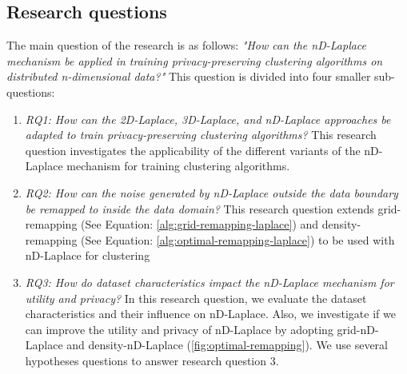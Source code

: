 \subsection{Research questions}
The main question of the research is as follows: \newline \newline
\textit{"How can the nD-Laplace mechanism be applied in training privacy-preserving clustering algorithms on distributed n-dimensional data?"} \newline
This question is divided into four smaller sub-questions:
\begin{enumerate}
  \item \textit{RQ1: How can the 2D-Laplace, 3D-Laplace, and nD-Laplace approaches be adapted to train privacy-preserving clustering algorithms?} \newline
        This research question investigates the applicability of the different variants of the nD-Laplace mechanism for training clustering algorithms.
  \item \textit{RQ2: How can the noise generated by nD-Laplace outside the data boundary be remapped to inside the data domain?} \newline
        This research question extends grid-remapping (See Equation: \ref{alg:grid-remapping-laplace}) and density-remapping (See Equation: \ref{alg:optimal-remapping-laplace}) to be used with nD-Laplace for clustering
  \item \textit{RQ3: How do dataset characteristics impact the nD-Laplace mechanism for utility and privacy?} \newline
        In this research question, we evaluate the dataset characteristics and their influence on nD-Laplace.
        Also, we investigate if we can improve the utility and privacy of nD-Laplace by adopting grid-nD-Laplace and density-nD-Laplace (\ref{fig:optimal-remapping}).
        We use several hypotheses questions to answer research question 3.


\end{enumerate}
